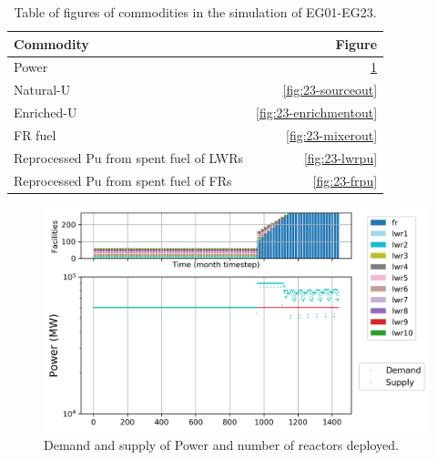 \documentclass[11pt]{article}
\begin{document}
\begin{table}[H]
	\centering
	\caption{Table of figures of commodities in the simulation of EG01-EG23.}
	\label{tab:23-commodities}
	\begin{tabularx}{\textwidth}{lR}
		\hline
		Commodity & Figure \\ \hline
  		Power           & \ref{fig:23-power} \\
		Natural-U       & \ref{fig:23-sourceout} \\
        Enriched-U   	& \ref{fig:23-enrichmentout} \\
        FR fuel       	& \ref{fig:23-mixerout} \\
  		Reprocessed Pu from spent fuel of LWRs & \ref{fig:23-lwrpu} \\
  		Reprocessed Pu from spent fuel of FRs  & \ref{fig:23-frpu} \\ \hline
	\end{tabularx}
\end{table}

\begin{figure}[H]
	\centering
	\includegraphics[width=\textwidth]{23-figures/0-poly-power.png} 
	\hfill
	\caption{Demand and supply of Power and number of reactors deployed.}
	\label{fig:23-power}
\end{figure}
\end{document}
